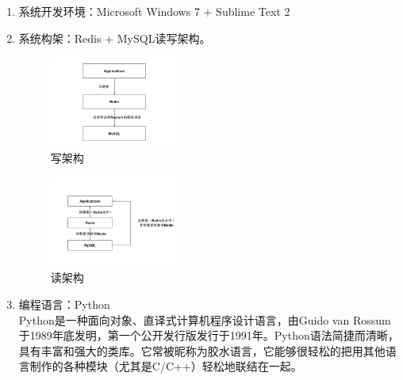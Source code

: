 \documentclass[proposal]{zjutreport}
\begin{document}
\begin{enumerate}[label=（\arabic*）]
\item{系统开发环境：Microsoft Windows 7 + Sublime Text 2}
\item{系统构架：Redis + MySQL读写架构。\\

\begin{figure}[htbp]
\centering
\includegraphics[width=0.4\textwidth]{redis1}
\caption{写架构}\label{fig:redis1}
\vspace{\baselineskip}
\end{figure}

\begin{figure}[htbp]
\centering
\includegraphics[width=0.4\textwidth]{redis2}
\caption{读架构}\label{fig:redis2}
\vspace{\baselineskip}
\end{figure}

}
\item{编程语言：Python\\

Python是一种面向对象、直译式计算机程序设计语言，由Guido van Rossum于1989年底发明，第一个公开发行版发行于1991年。Python语法简捷而清晰，具有丰富和强大的类库。它常被昵称为胶水语言，它能够很轻松的把用其他语言制作的各种模块（尤其是C/C++）轻松地联结在一起。

}
\end{enumerate}
\end{document}
